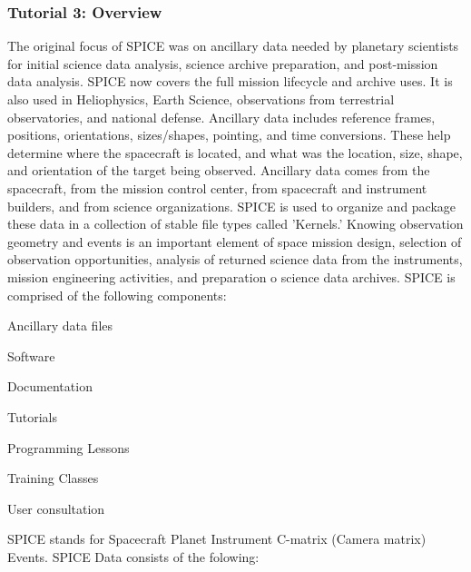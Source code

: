 \documentclass[crop=false,class=book]{standalone}
\begin{document}
            \subsubsection{Tutorial 3: Overview}
            The original focus of SPICE was on ancillary data needed by planetary scientists for initial science data analysis, science archive preparation, and post-mission data analysis. SPICE now covers the full mission lifecycle and archive uses. It is also used in Heliophysics, Earth Science, observations from terrestrial observatories, and national defense. Ancillary data includes reference frames, positions, orientations, sizes/shapes, pointing, and time conversions. These help determine where the spacecraft is located, and what was the location, size, shape, and orientation of the target being observed. Ancillary data comes from the spacecraft, from the mission control center, from spacecraft and instrument builders, and from science organizations. SPICE is used to organize and package these data in a collection of stable file types called 'Kernels.' Knowing observation geometry and events is an important element of space mission design, selection of observation opportunities, analysis of returned science data from the instruments, mission engineering activities, and preparation o science data archives. SPICE is comprised of the following components:
            \begin{enumerate}
            \begin{multicols}{3}
                \item Ancillary data files
                \item Software
                \item Documentation
                \item Tutorials
                \item Programming Lessons
                \item Training Classes
                \item User consultation
            \end{multicols}
            \end{enumerate}
            SPICE stands for Spacecraft Planet Instrument C-matrix (Camera matrix) Events. SPICE Data consists of the folowing:
\end{document}

